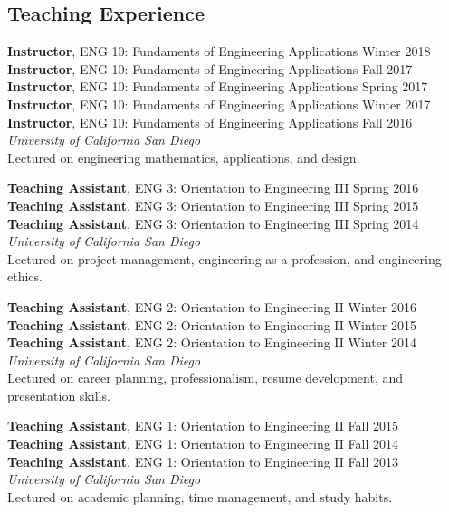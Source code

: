 \documentclass[]{res}
\begin{document}
\begin{resume}
\section{Teaching Experience}
\vspace{0.1in}

\textbf{Instructor}, ENG 10: Fundaments of Engineering Applications \hfill Winter 2018 \\
\textbf{Instructor}, ENG 10: Fundaments of Engineering Applications \hfill Fall 2017 \\
\textbf{Instructor}, ENG 10: Fundaments of Engineering Applications \hfill Spring 2017 \\
\textbf{Instructor}, ENG 10: Fundaments of Engineering Applications \hfill Winter 2017 \\
\textbf{Instructor}, ENG 10: Fundaments of Engineering Applications \hfill Fall 2016 \\
\textit{University of California San Diego} \\
Lectured on engineering mathematics, applications, and design.

\textbf{Teaching Assistant}, ENG 3: Orientation to Engineering III \hfill Spring 2016 \\
\textbf{Teaching Assistant}, ENG 3: Orientation to Engineering III \hfill Spring 2015 \\
\textbf{Teaching Assistant}, ENG 3: Orientation to Engineering III \hfill Spring 2014 \\
\textit{University of California San Diego} \\
Lectured on project management, engineering as a profession, and engineering ethics.

\textbf{Teaching Assistant}, ENG 2: Orientation to Engineering II \hfill Winter 2016 \\
\textbf{Teaching Assistant}, ENG 2: Orientation to Engineering II \hfill Winter 2015 \\
\textbf{Teaching Assistant}, ENG 2: Orientation to Engineering II \hfill Winter 2014 \\
\textit{University of California San Diego} \\
Lectured on career planning, professionalism, resume development, and presentation skills.

\textbf{Teaching Assistant}, ENG 1: Orientation to Engineering II \hfill Fall 2015 \\
\textbf{Teaching Assistant}, ENG 1: Orientation to Engineering II \hfill Fall 2014 \\
\textbf{Teaching Assistant}, ENG 1: Orientation to Engineering II \hfill Fall 2013 \\
\textit{University of California San Diego} \\
Lectured on academic planning, time management, and study habits.




\end{resume}
\end{document}
